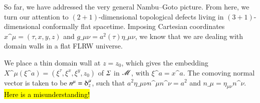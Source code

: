 




So far, we have addressed the very general Nambu--Goto picture. %
From here, we turn our attention to $(2+1)$-dimensional topological defects living in $(3+1)$-dimensional conformally flat spacetime. Imposing Cartesian coordinates $x\^\mu=(\tau,x,y,z)$ and $g\_{\mu\nu} = a^2 (\tau) \eta\_{\mu\nu}$, we know that we are dealing with domain walls in a flat FLRW universe. 


We place a thin domain wall at $z=z_0$, which gives the embedding $X\^\mu(\xi\^a)=(\xi^\tau, \xi^x, \xi^y, z_0)$ of $\varSigma$ in $\mathscr{M}$, with $\xi\^a= x\^a$. The comoving normal vector is taken to be 
%
$n\^\mu = \Krondelta*{^\mu_z}$, such that $a^2 \eta\_{\mu\nu}n\^\mu n\^\nu=a^2$ and $n\_\mu = \eta_{\mu\nu}n\^\nu$. %
\hl{Here is a misunderstanding!}





